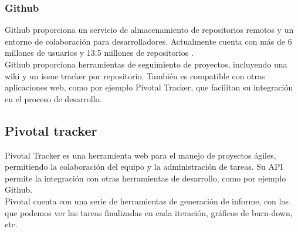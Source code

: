 \subsubsection{Github}

Github proporciona un servicio de almacenamiento de repositorios remotos y un entorno de colaboración para desarrolladores.
Actualmente cuenta con más de 6 millones de usuarios y 13.5 millones de repositorios \cite{website:github}.
\\
Github proporciona herramientas de seguimiento de proyectos, incluyendo una wiki y un issue tracker por repositorio.
También es compatible con otras aplicaciones web, como por ejemplo Pivotal Tracker, que facilitan su integración en el proceso de desarrollo.

\subsection{Pivotal tracker}

Pivotal Tracker es una herramienta web para el manejo de proyectos ágiles, permitiendo la colaboración del equipo y la administración de tareas.
Su API permite la integración con otras herramientas de desarrollo, como por ejemplo Github.
\\
Pivotal cuenta con una serie de herramientas de generación de informe, con las que podemos ver las tareas finalizadas en cada iteración, gráficos de burn-down, etc.